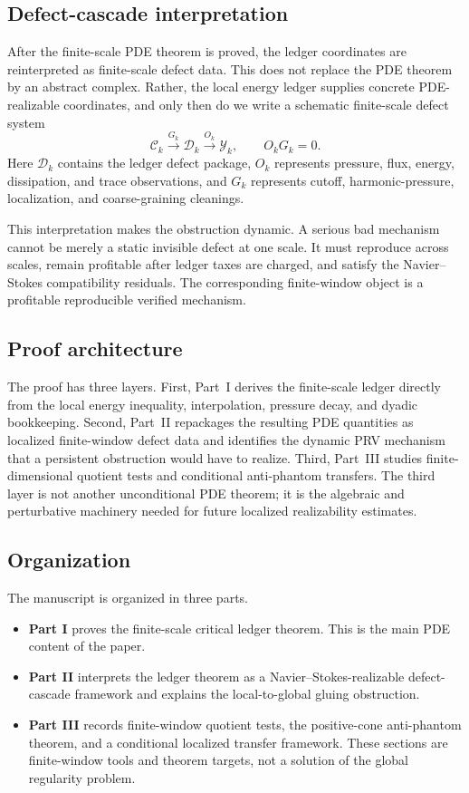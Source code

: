 \documentclass[11pt]{article}
\numberwithin{equation}{section}
\newcommand{\calC}{\mathcal C}
\newcommand{\calD}{\mathcal D}
\newcommand{\calY}{\mathcal Y}
\begin{document}
\subsection{Defect-cascade interpretation}

After the finite-scale PDE theorem is proved, the ledger coordinates are
reinterpreted as finite-scale defect data.  This does not replace the PDE
theorem by an abstract complex.  Rather, the local energy ledger supplies
concrete PDE-realizable coordinates, and only then do we write a schematic
finite-scale defect system
\[
    \calC_k \xrightarrow{G_k} \calD_k \xrightarrow{O_k} \calY_k,
    \qquad O_kG_k=0.
\]
Here \(\calD_k\) contains the ledger defect package, \(O_k\) represents
pressure, flux, energy, dissipation, and trace observations, and \(G_k\)
represents cutoff, harmonic-pressure, localization, and coarse-graining
cleanings.

This interpretation makes the obstruction dynamic.  A serious bad mechanism
cannot be merely a static invisible defect at one scale.  It must reproduce
across scales, remain profitable after ledger taxes are charged, and satisfy
the Navier--Stokes compatibility residuals.  The corresponding finite-window
object is a profitable reproducible verified mechanism.

\subsection{Proof architecture}

The proof has three layers.  First, Part~I derives the finite-scale ledger
directly from the local energy inequality, interpolation, pressure decay, and
dyadic bookkeeping.  Second, Part~II repackages the resulting PDE quantities
as localized finite-window defect data and identifies the dynamic PRV
mechanism that a persistent obstruction would have to realize.  Third,
Part~III studies finite-dimensional quotient tests and conditional
anti-phantom transfers.  The third layer is not another unconditional PDE
theorem; it is the algebraic and perturbative machinery needed for future
localized realizability estimates.

\subsection{Organization}

The manuscript is organized in three parts.

\begin{itemize}[leftmargin=2em]
    \item \textbf{Part I} proves the finite-scale critical ledger theorem.  This is the main PDE content of the paper.
    \item \textbf{Part II} interprets the ledger theorem as a Navier--Stokes-realizable defect-cascade framework and explains the local-to-global gluing obstruction.
    \item \textbf{Part III} records finite-window quotient tests, the positive-cone anti-phantom theorem, and a conditional localized transfer framework.  These sections are finite-window tools and theorem targets, not a solution of the global regularity problem.
\end{itemize}
\end{document}
